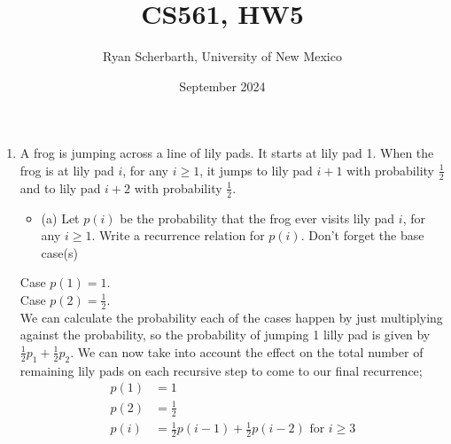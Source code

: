 \documentclass{article}
\title{CS561, HW5}
\author{Ryan Scherbarth, University of New Mexico}
\date{September 2024}
\begin{document}
\maketitle

\begin{enumerate}

\item A frog is jumping across a line of lily pads. It starts at lily pad 1. When the frog is at lily pad $i$, for any $i \geq 1$, it jumps to lily pad $i+1$ with probability $\frac{1}{2}$ and to lily pad $i+2$ with probability $\frac{1}{2}$.
\begin{itemize}
    \item (a) Let $p(i)$ be the probability that the frog ever visits lily pad $i$, for any $i \geq 1$. Write a recurrence relation for $p(i)$. Don't forget the base case(s)
\end{itemize}
Case $p(1) = 1$. \\
Case $p(2) = \frac{1}{2}$. \\
\newline 
We can calculate the probability each of the cases happen by just multiplying against the probability, so the probability of jumping 1 lilly pad is given by $\frac{1}{2}p_1 + \frac{1}{2}p_2$. We can now take into account the effect on the total number of remaining lily pads on each recursive step to come to our final recurrence;
\begin{align*}
    p(1) & = 1 \\
    p(2) & = \frac{1}{2} \\
    p(i) & = \frac{1}{2}p(i-1) + \frac{1}{2}p(i-2) \text{ for } i \geq 3
\end{align*} \\
\newline 








\end{enumerate}
\end{document}
